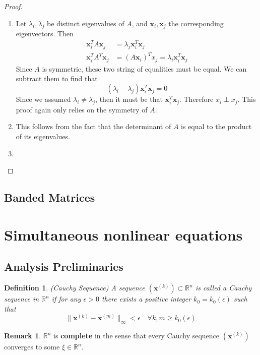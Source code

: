 \documentclass[12pt]{article}
\newtheorem{definition}{Definition}
\theoremstyle{definition}
\newtheorem{remark}{Remark}
\newcommand{\e}{\epsilon}
\newcommand{\R}{\mathbb{R}}
\newcommand{\norm}[1]{\lVert#1\rVert}
\newcommand{\x}{\bm{x}}
\begin{document}
\begin{proof}
\begin{enumerate}
	\item Let $\lambda_i, \lambda_j$ be distinct eigenvalues of $A$, and $\x_i, \x_j$ the corresponding eigenvectors. Then
	\begin{align*}
		\x_i^T A \x_j &= \lambda_j \x_i^T \x_j \\
		\x_i^T A^T \x_j &= (A\x_i)^T x_j = \lambda_i \x_i^T \x_j 
	\end{align*}
	Since $A$ is symmetric, these two string of equalities must be equal. We can subtract them to find that 
	\begin{equation}
		(\lambda_i - \lambda_j)\x_i^T \x_j = 0
	\end{equation}
	Since we assumed $\lambda_i \neq \lambda_j$, then it must be that $\x_i^T \x_j$. Therefore $x_i \perp x_j$. This proof again only relies on the symmetry of $A$. 
	\item This follows from the fact that the determinant of $A$ is equal to the product of its eigenvalues. 

	\item 

\end{enumerate}
\end{proof}

\subsection{Banded Matrices}

\section{Simultaneous nonlinear equations}

\subsection{Analysis Preliminaries}
\begin{definition}(Cauchy Sequence)
A sequence $(\x^{(k)}) \subset \R^n$ is called a Cauchy sequence in $\R^n$ if for any $\e > 0$ there exists a positive integer $k_0 = k_0(\e)$ such that
\begin{equation}
	\norm{\x^{(k)} - \x^{(m)}}_{\infty} < \e \quad \forall k, m \geq k_0(\e)
\end{equation}
\end{definition}

\begin{remark}
$\R^n$ is \textbf{complete} in the sense that every Cauchy sequence $(\x^{(k)})$ converges to some $\xi \in \R^n$. 
\end{remark}
\end{document}
